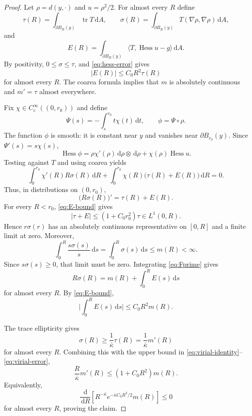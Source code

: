 \documentclass[11pt,reqno]{amsart}
\theoremstyle{definition}
\theoremstyle{remark}
\newcommand{\tr}{\operatorname{tr}}
\newcommand{\Hess}{\operatorname{Hess}}
\newcommand{\dd}{\,\mathrm d}
\newcommand{\abs}[1]{\lvert #1\rvert}
\newcommand{\inner}[2]{\langle #1,#2\rangle}
\begin{document}
\begin{proof}
Let $\rho=d(y,\cdot)$ and $u=\rho^2/2$.  For almost every $R$ define
\[
\tau(R)=\int_{\partial B_R(y)}\tr T\dd A,
\qquad
\sigma(R)=\int_{\partial B_R(y)}T(\nabla\rho,\nabla\rho)\dd A,
\]
and
\[
E(R)=\int_{\partial B_R(y)}\inner{T}{\Hess u-g}\dd A.
\]
By positivity, $0\le\sigma\le\tau$, and \eqref{eq:hess-error} gives
\begin{equation}\label{eq:E-bound}
\abs{E(R)}\le C_0R^2\tau(R)
\end{equation}
for almost every $R$.  The coarea formula implies that $m$ is absolutely continuous and $m'=\tau$ almost everywhere.

Fix $\chi\in C_c^\infty((0,r_0))$ and define
\[
\Psi(s)=-\int_s^{r_0}t\chi(t)\dd t,
\qquad
\phi=\Psi\circ\rho.
\]
The function $\phi$ is smooth: it is constant near $y$ and vanishes near $\partial B_{r_0}(y)$.  Since $\Psi'(s)=s\chi(s)$,
\[
\Hess\phi=\rho\chi'(\rho)\dd\rho\otimes\dd\rho+\chi(\rho)\Hess u.
\]
Testing against $T$ and using coarea yields
\[
\int_0^{r_0}\chi'(R)R\sigma(R)\dd R
 +\int_0^{r_0}\chi(R)\bigl(\tau(R)+E(R)\bigr)\dd R=0.
\]
Thus, in distributions on $(0,r_0)$,
\begin{equation}\label{eq:Fprime}
\bigl(R\sigma(R)\bigr)'=\tau(R)+E(R).
\end{equation}
For every $R<r_0$, \eqref{eq:E-bound} gives
\[
\abs{\tau+E}\le(1+C_0r_0^2)\tau\in L^1(0,R).
\]
Hence $r\sigma(r)$ has an absolutely continuous representative on $[0,R]$ and a finite limit at zero.  Moreover,
\[
\int_0^R\frac{s\sigma(s)}s\dd s=\int_0^R\sigma(s)\dd s\le m(R)<\infty.
\]
Since $s\sigma(s)\ge0$, that limit must be zero.  Integrating \eqref{eq:Fprime} gives
\begin{equation}\label{eq:virial-identity}
R\sigma(R)=m(R)+\int_0^RE(s)\dd s
\end{equation}
for almost every $R$.  By \eqref{eq:E-bound},
\begin{equation}\label{eq:virial-error}
\abs{\int_0^RE(s)\dd s}
\le C_0R^2m(R).
\end{equation}

The trace ellipticity gives
\[
\sigma(R)\ge\frac1{\bar\kappa}\tau(R)
=\frac1{\bar\kappa}m'(R)
\]
for almost every $R$.  Combining this with the upper bound in \eqref{eq:virial-identity}--\eqref{eq:virial-error},
\[
\frac R{\bar\kappa}m'(R)
\le(1+C_0R^2)m(R).
\]
Equivalently,
\[
\frac{\dd}{\dd R}
\left[R^{-\bar\kappa}e^{-\bar\kappa C_0R^2/2}m(R)\right]\le0
\]
for almost every $R$, proving the claim.
\end{proof}
\end{document}
